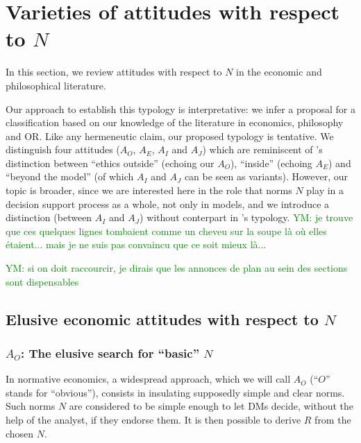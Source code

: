 \documentclass[preprint, french, english, 11pt, authoryear]{elsarticle}%
\newcommand{\protectforpdf}[1]{\texorpdfstring{\ensuremath{#1}}{#1}}
\newcommand{\ac}[1]{#1}
\newcommand{\acp}[1]{#1s}
\newcommand{\commentYM}[1]{\textcolor{green}{YM: #1}}
\begin{document}
\section{Varieties of attitudes with respect to \protectforpdf{N}}
\label{sec:existing}
In this section, we review attitudes with respect to $N$ in the economic and philosophical literature.
\begin{changebar}
Our approach to establish this typology is interpretative: we infer a proposal for a classification based on our knowledge of the literature in economics, philosophy and \ac{OR}.
Like any hermeneutic claim, our proposed typology is tentative.
We distinguish four attitudes ($A_O$, $A_E$, $A_I$ and $A_J$) which are reminiscent of \citet{le_menestrel_ethics_2004}'s distinction between ``ethics outside'' (echoing our $A_O$), ``inside'' (echoing $A_E$) and ``beyond the model'' (of which $A_I$ and $A_J$ can be seen as variants). 
However, our topic is broader, since we are interested here in the role that norms $N$ play in a decision support process as a whole, not only in models, and we introduce a distinction (between $A_I$ and $A_J$) without conterpart in \citet{le_menestrel_ethics_2004}'s typology.
\commentYM{je trouve que ces quelques lignes tombaient comme un cheveu sur la soupe là où elles étaient... mais je ne suis pas convaincu que ce soit mieux là...} 
\end{changebar}

\commentYM{si on doit raccourcir, je dirais que les annonces de plan au sein des sections sont dispensables}

\subsection{Elusive economic attitudes with respect to \protectforpdf{N}}
\subsubsection{\texorpdfstring{$A_O$}{AO}: The elusive search for ``basic'' \protectforpdf{N}}
In normative economics, a widespread approach, which we will call $A_O$ (``$O$'' stands for “obvious”), consists in insulating supposedly simple and clear norms. 
Such norms $N$ are considered to be simple enough to let \acp{DM} decide, without the help of the analyst, if they endorse them. It is then possible to derive $R$ from the chosen $N$.
\end{document}
